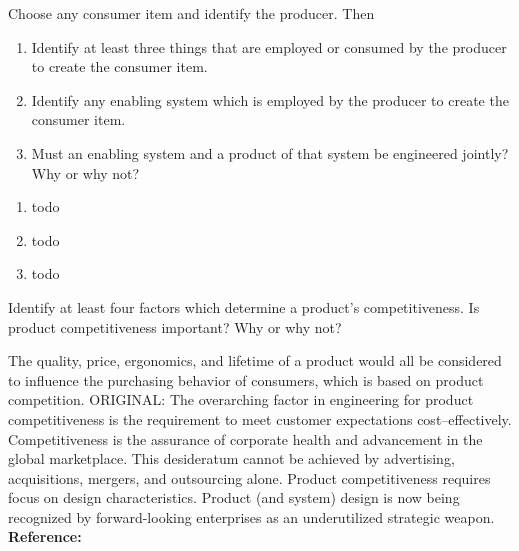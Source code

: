 \begin{exercises}
    \begin{exercise}
    \label{sea-2-7_8}
        Choose any consumer item and identify the producer. Then
        \begin{enumerate}[label=\alph*)]
            \item Identify at least three things that are employed or consumed by the producer to create the consumer item.
            \item Identify any enabling system which is employed by the producer to create the consumer item.
            \item Must an enabling system and a product of that system be engineered jointly? Why or why not?
        \end{enumerate}
    \end{exercise}
    \begin{solution}
        \begin{enumerate}[label=\alph*)]
            \item todo
            \item todo
            \item todo
        \end{enumerate}
    \end{solution}
    
    \begin{exercise} 
    \label{sea-2-9}
        Identify at least four factors which determine a product's competitiveness. Is product competitiveness important? Why or why not?
    \end{exercise}
    \begin{solution}
        The quality, price, ergonomics, and lifetime of a product would all be considered to influence the purchasing behavior of consumers, which is based on product competition. ORIGINAL: The overarching factor in engineering for product competitiveness is the requirement to meet customer expectations cost–effectively. Competitiveness is the assurance of corporate health and advancement in the global marketplace. This desideratum cannot be achieved by advertising, acquisitions, mergers, and outsourcing alone. Product competitiveness requires focus on design characteristics. Product (and system) design is now being recognized by forward-looking enterprises as an underutilized strategic weapon. \textbf{Reference:}
    \end{solution}
    

\end{exercises}
